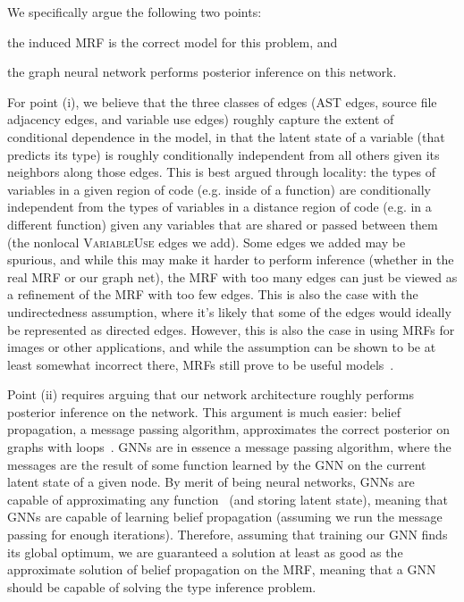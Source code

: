 We specifically argue the following two points:
\begin{enumerate*}[label=(\roman*)]
	\item the induced MRF is the correct model for this problem, and
	\item the graph neural network performs posterior inference on this network.
\end{enumerate*}

For point (i), we believe that the three classes of edges (AST edges, source file adjacency edges, and variable use edges) roughly capture the extent of conditional dependence in the model, in that the latent state of a variable (that predicts its type) is roughly conditionally independent from all others given its neighbors along those edges.
This is best argued through locality: the types of variables in a given region of code (e.g. inside of a function) are conditionally independent from the types of variables in a distance region of code (e.g. in a different function) given any variables that are shared or passed between them (the nonlocal \textsc{VariableUse} edges we add).
Some edges we added may be spurious, and while this may make it harder to perform inference (whether in the real MRF or our graph net), the MRF with too many edges can just be viewed as a refinement of the MRF with too few edges.
This is also the case with the undirectedness assumption, where it's likely that some of the edges would ideally be represented as directed edges.
However, this is also the case in using MRFs for images or other applications, and while the assumption can be shown to be at least somewhat incorrect there, MRFs still prove to be useful models~\cite{rangarajan95markov}.

Point (ii) requires arguing that our network architecture roughly performs posterior inference on the network.
This argument is much easier: belief propagation, a message passing algorithm, approximates the correct posterior on graphs with loops~\cite{weiss2000correctness}.
GNNs are in essence a message passing algorithm, where the messages are the result of some function learned by the GNN on the current latent state of a given node.
By merit of being neural networks, GNNs are capable of approximating any function~\cite{hornik1989multilayer} (and storing latent state), meaning that GNNs are capable of learning belief propagation (assuming we run the message passing for enough iterations).
Therefore, assuming that training our GNN finds its global optimum, we are guaranteed a solution at least as good as the approximate solution of belief propagation on the MRF, meaning that a GNN should be capable of solving the type inference problem.
